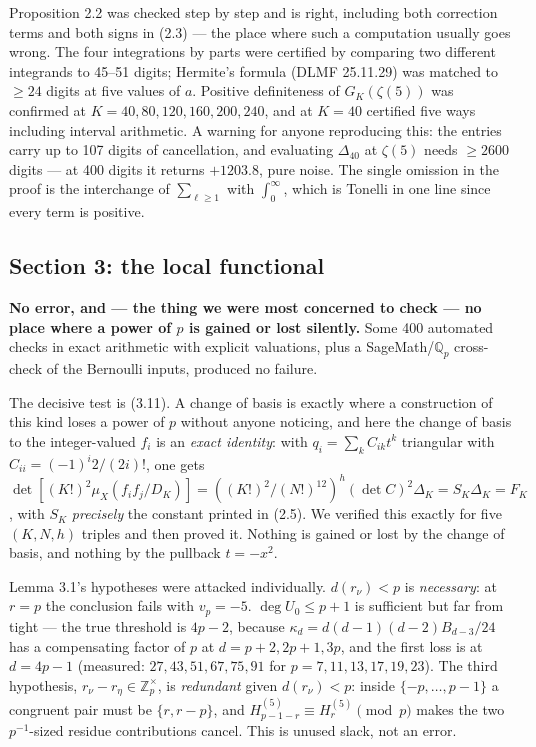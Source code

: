 \documentclass[11pt]{article}
\theoremstyle{definition}
\newcommand{\z}{\zeta(5)}
\begin{document}
Proposition 2.2 was checked step by step and is right, including both correction terms and both
signs in (2.3) --- the place where such a computation usually goes wrong. The four integrations
by parts were certified by comparing two different integrands to 45--51 digits; Hermite's
formula (DLMF 25.11.29) was matched to $\ge24$ digits at five values of $a$. Positive
definiteness of $G_K(\z)$ was confirmed at $K=40,80,120,160,200,240$, and at $K=40$ certified
five ways including interval arithmetic. A warning for anyone reproducing this: the entries
carry up to 107 digits of cancellation, and evaluating $\Delta_{40}$ at $\z$ needs $\ge2600$
digits --- at 400 digits it returns $+1203.8$, pure noise. The single omission in the proof is
the interchange of $\sum_{\ell\ge1}$ with $\int_0^\infty$, which is Tonelli in one line since
every term is positive.

\subsection{Section 3: the local functional}

\textbf{No error, and --- the thing we were most concerned to check --- no place where a power
of $p$ is gained or lost silently.} Some 400 automated checks in exact arithmetic with explicit
valuations, plus a SageMath/$\mathbb{Q}_p$ cross-check of the Bernoulli inputs, produced no
failure.

The decisive test is (3.11). A change of basis is exactly where a construction of this kind
loses a power of $p$ without anyone noticing, and here the change of basis to the
integer-valued $f_i$ is an \emph{exact identity}: with $q_i=\sum_kC_{ik}t^k$ triangular with
$C_{ii}=(-1)^i2/(2i)!$, one gets
$\det[(K!)^2\mu_X(f_if_j/D_K)]=((K!)^2/(N!)^{12})^h(\det C)^2\Delta_K=S_K\Delta_K=F_K$,
with $S_K$ \emph{precisely} the constant printed in (2.5). We verified this exactly for five
$(K,N,h)$ triples and then proved it. Nothing is gained or lost by the change of basis, and
nothing by the pullback $t=-x^2$.

Lemma 3.1's hypotheses were attacked individually. $d(r_\nu)<p$ is \emph{necessary}: at $r=p$
the conclusion fails with $v_p=-5$. $\deg U_0\le p+1$ is sufficient but far from tight --- the
true threshold is $4p-2$, because $\kappa_d=d(d-1)(d-2)B_{d-3}/24$ has a compensating factor of
$p$ at $d=p+2,2p+1,3p$, and the first loss is at $d=4p-1$ (measured: $27,43,51,67,75,91$ for
$p=7,11,13,17,19,23$). The third hypothesis, $r_\nu-r_\eta\in\mathbb{Z}_p^\times$, is
\emph{redundant} given $d(r_\nu)<p$: inside $\{-p,\dots,p-1\}$ a congruent pair must be
$\{r,r-p\}$, and $H^{(5)}_{p-1-r}\equiv H^{(5)}_r\pmod p$ makes the two $p^{-1}$-sized residue
contributions cancel. This is unused slack, not an error.
\end{document}
